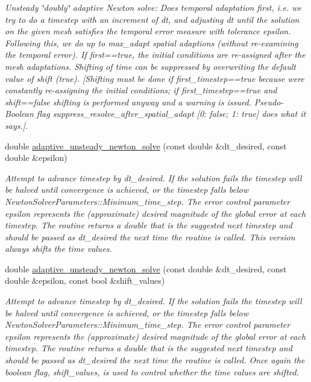 \begin{DoxyCompactItemize}
\begin{DoxyCompactList}\small\item\em Unsteady \char`\"{}doubly\char`\"{} adaptive Newton solve\+: Does temporal adaptation first, i.\+e. we try to do a timestep with an increment of dt, and adjusting dt until the solution on the given mesh satisfies the temporal error measure with tolerance epsilon. Following this, we do up to max\+\_\+adapt spatial adaptions (without re-\/examining the temporal error). If first==true, the initial conditions are re-\/assigned after the mesh adaptations. Shifting of time can be suppressed by overwriting the default value of shift (true). \mbox{[}Shifting must be done if first\+\_\+timestep==true because we\textquotesingle{}re constantly re-\/assigning the initial conditions; if first\+\_\+timestep==true and shift==false shifting is performed anyway and a warning is issued. Pseudo-\/\+Boolean flag suppress\+\_\+resolve\+\_\+after\+\_\+spatial\+\_\+adapt \mbox{[}0\+: false; 1\+: true\mbox{]} does what it says.\mbox{]}. \end{DoxyCompactList}\item 
double \hyperlink{classoomph_1_1Problem_abf6681f21f614ed7f15cc675ed6f692a}{adaptive\+\_\+unsteady\+\_\+newton\+\_\+solve} (const double \&dt\+\_\+desired, const double \&epsilon)
\begin{DoxyCompactList}\small\item\em Attempt to advance timestep by dt\+\_\+desired. If the solution fails the timestep will be halved until convergence is achieved, or the timestep falls below Newton\+Solver\+Parameters\+::\+Minimum\+\_\+time\+\_\+step. The error control parameter epsilon represents the (approximate) desired magnitude of the global error at each timestep. The routine returns a double that is the suggested next timestep and should be passed as dt\+\_\+desired the next time the routine is called. This version always shifts the time values. \end{DoxyCompactList}\item 
double \hyperlink{classoomph_1_1Problem_a3f5bde6d7fa8972e01a20c522b5fb2ef}{adaptive\+\_\+unsteady\+\_\+newton\+\_\+solve} (const double \&dt\+\_\+desired, const double \&epsilon, const bool \&shift\+\_\+values)
\begin{DoxyCompactList}\small\item\em Attempt to advance timestep by dt\+\_\+desired. If the solution fails the timestep will be halved until convergence is achieved, or the timestep falls below Newton\+Solver\+Parameters\+::\+Minimum\+\_\+time\+\_\+step. The error control parameter epsilon represents the (approximate) desired magnitude of the global error at each timestep. The routine returns a double that is the suggested next timestep and should be passed as dt\+\_\+desired the next time the routine is called. Once again the boolean flag, shift\+\_\+values, is used to control whether the time values are shifted. \end{DoxyCompactList}\item 

\end{DoxyCompactItemize}
